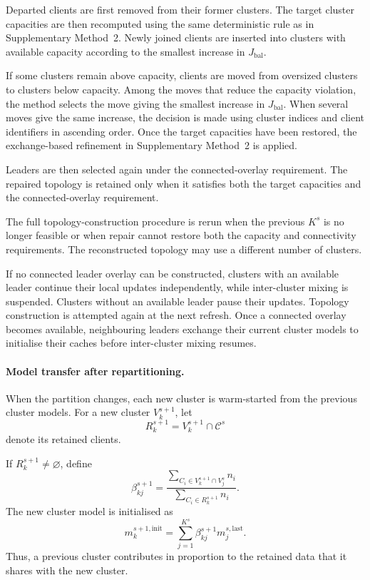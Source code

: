 \documentclass[pdflatex,sn-mathphys-num]{sn-jnl}
\begin{document}
Departed clients are first removed from their former clusters. The target cluster capacities are then recomputed using the same deterministic rule as in Supplementary Method~2. Newly joined clients are inserted into clusters with available capacity according to the smallest increase in \(J_{\mathrm{bal}}\).

If some clusters remain above capacity, clients are moved from oversized clusters to clusters below capacity. Among the moves that reduce the capacity violation, the method selects the move giving the smallest increase in \(J_{\mathrm{bal}}\). When several moves give the same increase, the decision is made using cluster indices and client identifiers in ascending order. Once the target capacities have been restored, the exchange-based refinement in Supplementary Method~2 is applied.

Leaders are then selected again under the connected-overlay requirement. The repaired topology is retained only when it satisfies both the target capacities and the connected-overlay requirement.

The full topology-construction procedure is rerun when the previous \(K^s\) is no longer feasible or when repair cannot restore both the capacity and connectivity requirements. The reconstructed topology may use a different number of clusters.

If no connected leader overlay can be constructed, clusters with an available leader continue their local updates independently, while inter-cluster mixing is suspended. Clusters without an available leader pause their updates. Topology construction is attempted again at the next refresh. Once a connected overlay becomes available, neighbouring leaders exchange their current cluster models to initialise their caches before inter-cluster mixing resumes.

\paragraph{Model transfer after repartitioning.}

When the partition changes, each new cluster is warm-started from the previous cluster models. For a new cluster \(V_k^{s+1}\), let
\[
R_k^{s+1}
=
V_k^{s+1}
\cap
\mathcal{C}^{s}
\]
denote its retained clients.

If \(R_k^{s+1}\neq\varnothing\), define
\begin{equation}
\beta_{kj}^{s+1}
=
\frac{
\sum_{C_i\in V_k^{s+1}\cap V_j^s}
n_i
}{
\sum_{C_i\in R_k^{s+1}}
n_i
}.
\label{eq:supp_overlap_transfer_weight}
\end{equation}
The new cluster model is initialised as
\begin{equation}
m_k^{s+1,\mathrm{init}}
=
\sum_{j=1}^{K^s}
\beta_{kj}^{s+1}
m_j^{s,\mathrm{last}} .
\label{eq:supp_overlap_model_transfer}
\end{equation}
Thus, a previous cluster contributes in proportion to the retained data that it shares with the new cluster.
\end{document}
